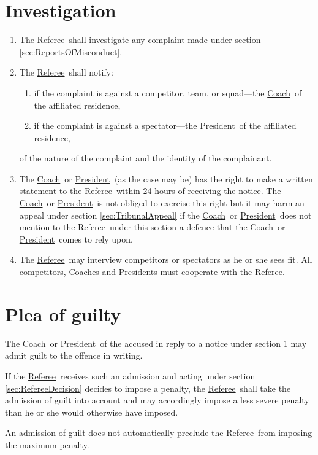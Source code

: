 \documentclass[12pt]{report}
\newcommand{\hyplink}[1]{\hyperlink{#1}{{#1}}}
\newcommand{\Captain}{\hyplink{Coach}}
\newcommand{\competitor}{\hyplink{competitor}}
\newcommand\President{\hyplink{President}}\newcommand\xPresident{President}
\newcommand{\Referee}{\hyplink{Referee}}
\begin{document}
  \section{Investigation}\label{sec:Investigation}
  \begin{enumerate}
    \item The \Referee\ shall investigate any complaint made  under section \ref{sec:ReportsOfMisconduct}.
    \item The \Referee\ shall notify:
    \begin{enumerate}
      \item if the complaint is against a competitor, team, or squad---the \Captain\ of the affiliated residence,
      \item if the complaint is against a spectator---the \President\ of the affiliated residence,
    \end{enumerate}
    of the nature of the complaint and the identity of the complainant.
    \item The \Captain\ or \President\ (as the case may be) has the right to make a written statement to the \Referee \ within 24 hours of receiving the notice. The \Captain\ or \President\ is not obliged to exercise this right but it may harm an appeal under section \ref{sec:TribunalAppeal} if the \Captain\ or \President\ does not mention to the \Referee\ under this section a defence that the \Captain\ or \President\ comes to rely upon.
    \item The \Referee\ may interview competitors or spectators as he or she sees fit. All \competitor s, \Captain es and  \President s must cooperate with the \Referee.
    \end{enumerate}
    \section{Plea of guilty}
  \begin{fenumerate}
    \item The \Captain\ or \President\ of the accused in reply to a notice under section \ref{sec:Investigation} may admit guilt to the offence in writing.
    \item If the \Referee\ receives such an admission and acting under section \ref{sec:RefereeDecision} decides to impose a penalty, the \Referee\ shall take the admission of guilt into account and may accordingly impose a less severe penalty than he or she would otherwise have imposed.
    \item An admission of guilt does not automatically preclude the \Referee\ from imposing the maximum penalty.
  \end{fenumerate}
\end{document}
